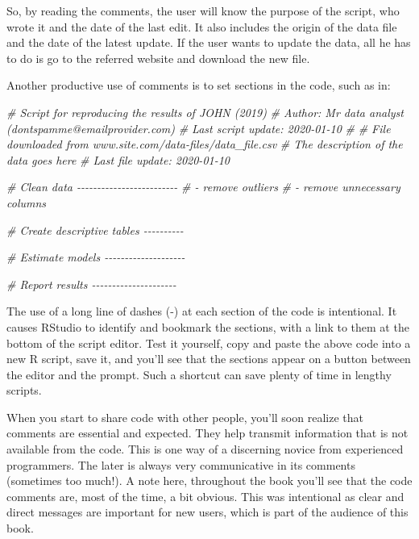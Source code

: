 \documentclass[
  12pt,
]{book}
\newenvironment{Shaded}{\begin{snugshade}}{\end{snugshade}}
\newcommand{\CommentTok}[1]{\textcolor[rgb]{0.37,0.37,0.37}{\textit{#1}}}
\newenvironment{rmdcaution}
{\begin{cautionblock}
		
	} {\end{cautionblock}}
\begin{document}
So, by reading the comments, the user will know the purpose of the script, who wrote it and the date of the last edit. It also includes the origin of the data file and the date of the latest update. If the user wants to update the data, all he has to do is go to the referred website and download the new file.

Another productive use of comments is to set sections in the code, such as in:

\begin{Shaded}
\begin{Highlighting}[]
\CommentTok{\# Script for reproducing the results of JOHN (2019)}
\CommentTok{\# Author: Mr data analyst (dontspamme@emailprovider.com)}
\CommentTok{\# Last script update: 2020{-}01{-}10}
\CommentTok{\#}
\CommentTok{\# File downloaded from www.site.com/data{-}files/data\_file.csv}
\CommentTok{\# The description of the data goes here}
\CommentTok{\# Last file update: 2020{-}01{-}10}

\CommentTok{\# Clean data {-}{-}{-}{-}{-}{-}{-}{-}{-}{-}{-}{-}{-}{-}{-}{-}{-}{-}{-}{-}{-}{-}{-}{-}{-}}
\CommentTok{\# {-} remove outliers}
\CommentTok{\# {-} remove unnecessary columns}

\CommentTok{\# Create descriptive tables {-}{-}{-}{-}{-}{-}{-}{-}{-}{-}}


\CommentTok{\# Estimate models {-}{-}{-}{-}{-}{-}{-}{-}{-}{-}{-}{-}{-}{-}{-}{-}{-}{-}{-}{-}}


\CommentTok{\# Report results {-}{-}{-}{-}{-}{-}{-}{-}{-}{-}{-}{-}{-}{-}{-}{-}{-}{-}{-}{-}{-}}
\end{Highlighting}
\end{Shaded}

The use of a long line of dashes (-) at each section of the code is intentional. It causes RStudio to identify and bookmark the sections, with a link to them at the bottom of the script editor. Test it yourself, copy and paste the above code into a new R script, save it, and you'll see that the sections appear on a button between the editor and the prompt. Such a shortcut can save plenty of time in lengthy scripts.

\begin{rmdcaution}
When you start to share code with other people, you'll soon realize that
comments are essential and expected. They help transmit information that
is not available from the code. This is one way of a discerning novice
from experienced programmers. The later is always very communicative in
its comments (sometimes too much!). A note here, throughout the book
you'll see that the code comments are, most of the time, a bit obvious.
This was intentional as clear and direct messages are important for new
users, which is part of the audience of this book.
\end{rmdcaution}
\end{document}
